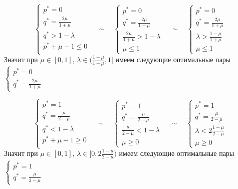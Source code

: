 \[
\begin{cases}
p^{*}=0 \\
q^{*}=\frac{2\mu}{1+\mu} \\
q^{*}>1-\lambda \\
p^{*}+\mu-1\leq 0 \\
\end{cases}
\quad\sim\quad
\begin{cases}
p^{*}=0 \\
q^{*}=\frac{2\mu}{1+\mu} \\
\frac{2\mu}{1+\mu}>1-\lambda \\
\mu \leq 1
\end{cases}
\quad\sim\quad
\begin{cases}
p^{*}=0 \\
q^{*}=\frac{2\mu}{1+\mu} \\
\lambda>\frac{1-\mu}{1+\mu} \\
\mu \leq 1
\end{cases}
\]
Значит при $\mu \in [0, 1]$, $\lambda \in (\frac{1-\mu}{1+\mu}, 1]$ имеем следующие оптимальные пары
$\begin{cases}p^{*}=0 \\ q^{*}=\frac{2\mu}{1+\mu} \end{cases}$



\[
\begin{cases}
p^{*}=1 \\
q^{*}=\frac{\mu}{2-\mu} \\
q^{*}<1-\lambda \\
p^{*}+\mu-1\geq 0 \\
\end{cases}
\quad\sim\quad
\begin{cases}
p^{*}=1 \\
q^{*}=\frac{\mu}{2-\mu} \\
\frac{\mu}{2-\mu}<1-\lambda \\
\mu \geq 0
\end{cases}
\quad\sim\quad
\begin{cases}
p^{*}=1 \\
q^{*}=\frac{\mu}{2-\mu} \\
\lambda<2\frac{1-\mu}{2-\mu} \\
\mu \geq 0
\end{cases}
\]
Значит при $\mu \in [0, 1]$, $\lambda \in [0, 2\frac{1-\mu}{2-\mu})$ имеем следующие оптимальные пары
$\begin{cases}p^{*}=1 \\ q^{*}=\frac{\mu}{2-\mu} \end{cases}$


